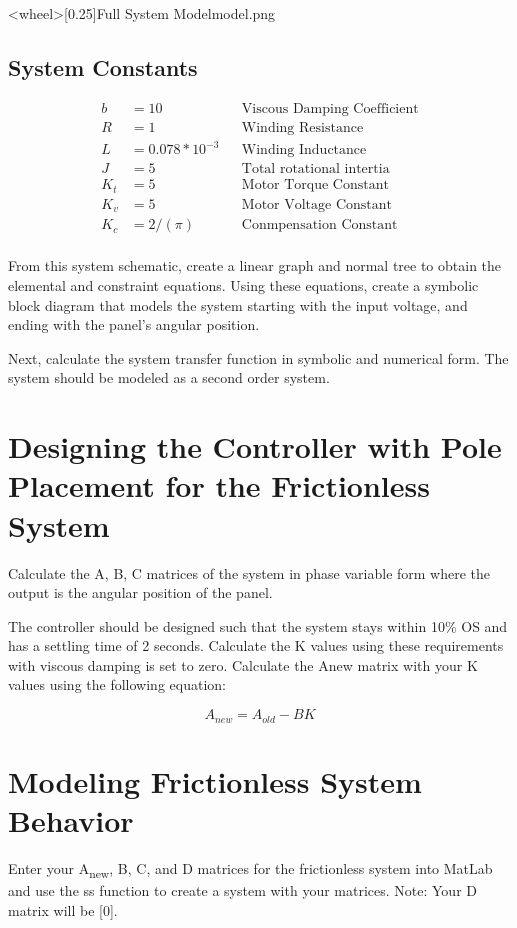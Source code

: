 \documentclass{homework}
\begin{document}
\img<wheel>[0.25]{Full System Model}{model.png}

\subsection*{System Constants}
\begin{align*}
	b & = 10         &  & \text{Viscous Damping Coefficient}         \\
	R & = 1           &  & \text{Winding Resistance}         \\
	L & = 0.078*10^{-3}           &  & \text{Winding Inductance}      \\
	J & = 5        &  & \text{Total rotational intertia}         \\
	K_t & = 5           &  & \text{Motor Torque Constant}         \\
	K_v & = 5          &  & \text{Motor Voltage Constant}      \\
	K_c & = 2/(\pi) &  & \text{Conmpensation Constant}	\\
\end{align*}

\question From this system schematic, create a linear graph and normal tree to obtain the elemental and constraint equations. Using these equations, create a symbolic block diagram that models the system starting with the input voltage, and ending with the panel's angular position.

\question Next, calculate the system transfer function in symbolic and numerical form. The system should be modeled as a second order system.

\section*{Designing the Controller with Pole Placement for the Frictionless System}

\question Calculate the A, B, C matrices of the system in phase variable form where the output is the angular position of the panel.  

\question The controller should be designed such that the system stays within 10\% OS and has a settling time of 2 seconds. Calculate the K values using these requirements with viscous damping is set to zero. Calculate the Anew matrix with your K values using the following equation: 

\[ A_{new} = A_{old} - BK \]

\newpage
\section*{Modeling Frictionless System Behavior}
\question Enter your A\textsubscript{new}, B, C, and D matrices for the frictionless system into MatLab and use the ss function to create a system with your matrices. Note: Your D matrix will be [0].
\end{document}
